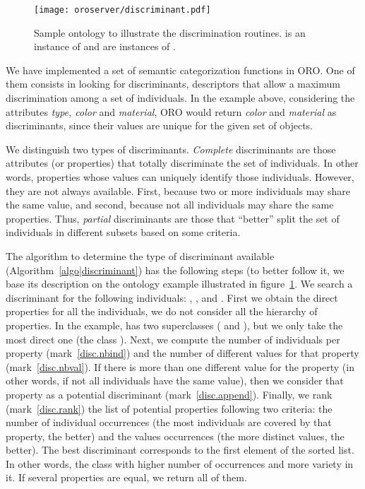 \begin{figure}
    \centering
    \texttt{[image: oroserver/discriminant.pdf]}
    \caption{Sample ontology to illustrate the discrimination routines.
     is an instance of  and
     are instances of .}
    \label{fig|discriminant}
\end{figure}

We have implemented a set of semantic categorization functions in ORO. One of
them consists in looking for discriminants, \ie descriptors that allow a
maximum discrimination among a set of individuals. In the example above,
considering the attributes \emph{type, color} and \emph{material}, ORO would
return \emph{color} and \emph{material} as discriminants, since their values
are unique for the given set of objects.

We distinguish two types of discriminants. \emph{Complete} discriminants are
those attributes (or properties) that totally discriminate the set of
individuals. In other words, properties whose values can uniquely identify
those individuals. However, they are not always available. First, because two
or more individuals may share the same value, and second, because not all
individuals may share the same properties. Thus, \emph{partial} discriminants
are those that ``better'' split the set of individuals in different subsets
based on some criteria.

The algorithm to determine the type of discriminant available
(Algorithm~\ref{algo|discriminant}) has the following steps (to better follow
it, we base its description on the ontology example illustrated in
figure~\ref{fig|discriminant}. We search a discriminant for the following
individuals: , ,  and
. First we obtain the direct properties for all the
individuals, \ie we do not consider all the hierarchy of properties. In the
example,  has two superclasses ( and
), but we only take the most direct one (the class
). Next, we compute the number of individuals per property
(mark~\ref{disc.nbind}) and the number of different values for that property
(mark~\ref{disc.nbval}). If there is more than one different value for the
property (in other words, if not all individuals have the same value), then we
consider that property as a potential discriminant (mark~\ref{disc.append}).
Finally, we rank (mark~\ref{disc.rank}) the list of potential properties
following two criteria: the number of individual occurrences (\ie the most
individuals are covered by that property, the better) and the values
occurrences (\ie the more distinct values, the better).  The best discriminant
corresponds to the first element of the sorted list. In other words, the class
with higher number of occurrences and more variety in it.  If several
properties are equal, we return all of them.

